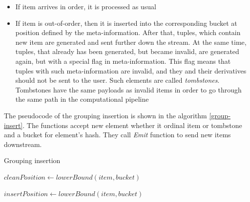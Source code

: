 \begin{itemize}
    \item If item arrives in order, it is processed as usual
    \item If item is out-of-order, then it is inserted into the corresponding bucket at position defined by the meta-information. After that, tuples, which contain new item are generated and sent further down the stream. At the same time, tuples, that already has been generated, but became invalid, are generated again, but with a special flag in meta-information. This flag means that tuples with such meta-information are invalid, and they and their derivatives should not be sent to the user. Such elements are called {\it tombstones}. Tombstones have the same payloads as invalid items in order to go through the same path in the computational pipeline
\end{itemize}

The pseudocode of the grouping insertion is shown in the algorithm \ref{group-insert}. The functions accept new element whether it ordinal item or tombstone and a bucket for element's hash. They call {\it Emit} function to send new items downstream.

\begin{algorithm}
\caption{Grouping insertion}
\label{group-insert}
  \begin{algorithmic}[1]
      \State $cleanPosition \gets lowerBound(item, bucket)$
        \State {}
      \EndFor

      \State {}

        \State {} 
      \EndFor
    \EndFunction

    \State

      \State $insertPosition \gets lowerBound(item, bucket)$
        \State {} 
      \EndFor
      
      \State {}

        \State {} 
      \EndFor
    \EndFunction
  \end{algorithmic}
\end{algorithm}

